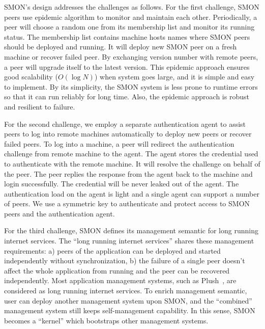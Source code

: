 SMON's design addresses the challenges as follows. For the
first challenge, SMON peers use epidemic algorithm to
monitor and maintain each other. Periodically, a peer will
choose a random one from its membership list and monitor its
running status. The membership list contains machine hosts
names where SMON peers should be deployed and running. It
will deploy new SMON peer on a fresh machine or recover
failed peer. 
By exchanging version number with remote peers, a peer will
upgrade itself to the latest version.  This epidemic
approach ensures good scalability ($O(\log N)$) when system
goes large, and it is simple and easy to implement. By its
simplicity, the SMON system is less prone to runtime errors
so that it can run reliably for long time. Also, the
epidemic approach is robust and resilient to failure.


For the second challenge, we employ a separate
authentication agent to assist peers to log into remote
machines automatically to deploy new peers or recover failed
peers. To log into a machine, a peer will redirect the
authentication challenge from remote machine to the agent.
The agent stores the credential used to authenticate with
the remote machine. It will resolve the challenge on behalf
of the peer. The peer replies the response from the agent
back to the machine and login successfully. The credential
will be never leaked out of the agent. The authentication
load on the agent is light and a single agent can support a
number of peers.  We use a symmetric key to authenticate and
protect access to SMON peers and the authentication agent.

For the third challenge, SMON defines its management
semantic for long running internet services. The ``long
running internet services'' shares these management
requirements: a) peers of the application can be deployed
and started independently without synchronization, b) the
failure of a single peer doesn't affect the whole
application from running and the peer can be recovered
independently.
Most application management systems, such as
Plush~\cite{Albrecht2007},
are considered as long running internet services. To enrich
management semantic, user can deploy another management
system upon SMON, and the ``combined'' management system
still keeps self-management capability. In this sense, SMON
becomes a ``kernel'' which bootstraps other management
systems.

